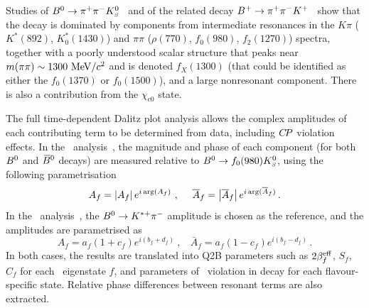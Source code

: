\mysubsubsubsection{$\Bz \to \pi^+\pi^-\KS$
}
\label{sec:cp_uta:notations:dalitz:pipik0}

Studies of $\Bz \to \pi^+\pi^-\KS$~\cite{Aubert:2009me,:2008wwa}
and of the related decay
$B^{+} \to \pi^+\pi^-K^+$~\cite{Garmash:2004wa,Garmash:2005rv,Aubert:2005ce,Aubert:2008bj}
show that the decay is dominated by components from intermediate resonances 
in the $K\pi$ ($K^*(892)$, $K^*_0(1430)$) 
and $\pi\pi$ ($\rho(770)$, $f_0(980)$, $f_2(1270)$) spectra,
together with a poorly understood scalar structure that peaks near 
$m(\pi\pi) \sim 1300 \ {\rm MeV}/c^2$ and is denoted $f_X(1300)$
(that could be identified as either the $f_0(1370)$ or $f_0(1500)$),
and a large nonresonant component.
There is also a contribution from the $\chi_{c0}$ state.

The full time-dependent Dalitz plot analysis allows 
the complex amplitudes of each contributing term to be determined from data,
including $C\!P$ violation effects.
In the \babar\ analysis~\cite{Aubert:2009me}, 
the magnitude and phase of each component (for both $B^0$ and $\kern 0.18em\overline{\kern -0.18em B}{}^0$ decays) 
are measured relative to $B^0 \to f_0(980)K^0_{\scriptscriptstyle S}$, using the following
parametrisation
\begin{equation}
  A_f = \left| A_f \right| e^{i\,{\rm arg}(A_f)}
  \ , \ \ \ \ 
  \bar{A}_f = \left| \bar{A}_f \right| e^{i\,{\rm arg}(\bar{A}_f)} \, .
\end{equation}
In the \belle\ analysis~\cite{:2008wwa}, the $B^0 \to K^{*+}\pi^-$ amplitude
is chosen as the reference, and the amplitudes are parametrised as 
\begin{equation}
  A_f = a_f ( 1 + c_f ) e^{i ( b_f + d_f )} 
  \ , \ \ \ \ 
  \bar{A}_f = a_f ( 1 - c_f ) e^{i ( b_f - d_f )} \, .
\end{equation}
In both cases, the results are translated into Q2B parameters 
such as $2\beta^{\rm eff}_f$, $S_f$, $C_f$ for each \CP\ eigenstate $f$,
and parameters of \CP\ violation in decay for each flavour-specific state.
Relative phase differences between resonant terms are also extracted.

\label{sec:cp_uta:notations:dalitz:pipipi0}

